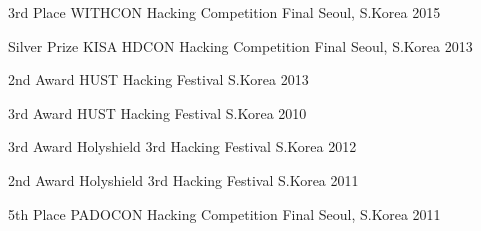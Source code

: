 \begin{cvhonors}

  \cvhonor
  {3rd Place} %
  {WITHCON Hacking Competition Final} %
  {Seoul, S.Korea} %
  {2015} %

  \cvhonor
  {Silver Prize} %
  {KISA HDCON Hacking Competition Final} %
  {Seoul, S.Korea} %
  {2013} %

  \cvhonor
  {2nd Award} %
  {HUST Hacking Festival} %
  {S.Korea} %
  {2013} %

  \cvhonor
  {3rd Award} %
  {HUST Hacking Festival} %
  {S.Korea} %
  {2010} %

  \cvhonor
  {3rd Award} %
  {Holyshield 3rd Hacking Festival} %
  {S.Korea} %
  {2012} %

  \cvhonor
  {2nd Award} %
  {Holyshield 3rd Hacking Festival} %
  {S.Korea} %
  {2011} %

  \cvhonor
  {5th Place} %
  {PADOCON Hacking Competition Final} %
  {Seoul, S.Korea} %
  {2011} %

\end{cvhonors}
